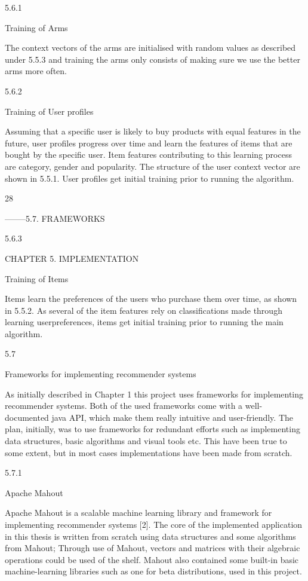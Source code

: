 5.6.1

Training of Arms

The context vectors of the arms are initialised with random values as described under
5.5.3 and training the arms only consists of making sure we use the better arms more
often.

5.6.2

Training of User profiles

Assuming that a specific user is likely to buy products with equal features in the future,
user profiles progress over time and learn the features of items that are bought by the
specific user. Item features contributing to this learning process are category, gender and
popularity. The structure of the user context vector are shown in 5.5.1. User profiles get
initial training prior to running the algorithm.

28

--------5.7. FRAMEWORKS

5.6.3

CHAPTER 5. IMPLEMENTATION

Training of Items

Items learn the preferences of the users who purchase them over time, as shown in
5.5.2. As several of the item features rely on classifications made through learning userpreferences, items get initial training prior to running the main algorithm.

5.7

Frameworks for implementing recommender systems

As initially described in Chapter 1 this project uses frameworks for implementing recommender systems. Both of the used frameworks come with a well-documented java API,
which make them really intuitive and user-friendly. The plan, initially, was to use frameworks for redundant efforts such as implementing data structures, basic algorithms and
visual tools etc. This have been true to some extent, but in most cases implementations
have been made from scratch.

5.7.1

Apache Mahout

Apache Mahout is a scalable machine learning library and framework for implementing
recommender systems [2]. The core of the implemented application in this thesis is
written from scratch using data structures and some algorithms from Mahout; Through
use of Mahout, vectors and matrices with their algebraic operations could be used of the
shelf. Mahout also contained some built-in basic machine-learning libraries such as one
for beta distributions, used in this project.

